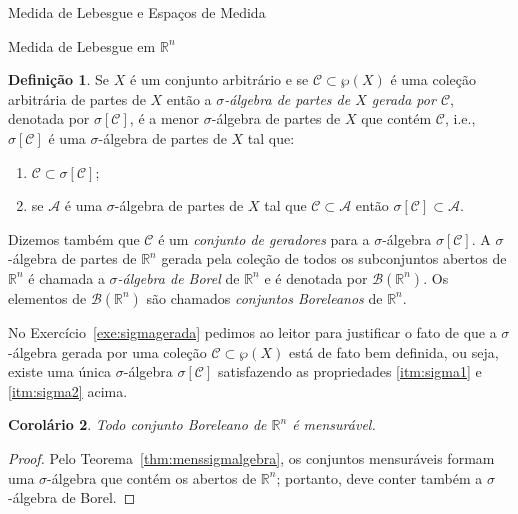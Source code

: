 \documentclass[oneside,final,11pt]{amsbook}
\newcommand{\R}{\mathds R}
\newcommand{\Borel}{\mathcal B}
\theoremstyle{remark}\newtheorem{exercise}{Exercício}[chapter]
\theoremstyle{remark}\newtheorem{*exercise}[exercise]{\hbox to 0pt{\hskip 0pt minus 1fil*}Exercício}
\theoremstyle{definition}\newtheorem{exdefin}{Definição}[chapter]
\theoremstyle{plain}\newtheorem{teo}{Teorema}[section]
\theoremstyle{plain}\newtheorem{lem}[teo]{Lema}
\theoremstyle{plain}\newtheorem{prop}[teo]{Proposição}
\theoremstyle{plain}\newtheorem{cor}[teo]{Corolário}
\theoremstyle{definition}\newtheorem{defin}[teo]{Definição}
\theoremstyle{remark}\newtheorem{rem}[teo]{Observação}
\theoremstyle{definition}\newtheorem{notation}[teo]{Notação}
\theoremstyle{definition}\newtheorem{convention}[teo]{Convenção}
\theoremstyle{definition}\newtheorem{example}[teo]{Exemplo}
\numberwithin{section}{chapter}
\numberwithin{equation}{section}
\begin{document}
\begin{chapter}{Medida de Lebesgue e Espaços de Medida}
\begin{section}[Medida de Lebesgue em $\R^n$]{Medida de Lebesgue em ${\R^n}$}
\begin{defin}\label{thm:defsigmagerada}
Se $X$ é um conjunto arbitrário e se $\mathcal C\subset\wp(X)$ é uma coleção arbitrária de partes de $X$ então
a {\em $\sigma$-álgebra de partes de $X$ gerada por $\mathcal C$\/}, denotada por $\sigma[\mathcal C]$\index[simbolos]{$\sigma[\mathcal C]$}, é a menor $\sigma$-álgebra
de partes de $X$ que contém $\mathcal C$, i.e., $\sigma[\mathcal C]$ é uma $\sigma$-álgebra de partes de $X$ tal que:
\begin{enumerate}
\item\label{itm:sigma1} $\mathcal C\subset\sigma[\mathcal C]$;
\item\label{itm:sigma2} se $\mathcal A$ é uma $\sigma$-álgebra de partes de $X$ tal que $\mathcal C\subset\mathcal A$ então
$\sigma[\mathcal C]\subset\mathcal A$.
\end{enumerate}
Dizemos também que $\mathcal C$ é um
{\em conjunto de geradores\/}
para a $\sigma$-álgebra $\sigma[\mathcal C]$.
A $\sigma$-álgebra de partes de $\R^n$ gerada pela coleção de todos os subconjuntos abertos de $\R^n$ é chamada a {\em
$\sigma$-álgebra de Borel\/} de
$\R^n$ e é denotada por $\Borel(\R^n)$. Os elementos de $\Borel(\R^n)$\index[simbolos]{$\Borel(\R^n)$}
são chamados {\em conjuntos Boreleanos\/} de $\R^n$.
\end{defin}
No Exercício~\ref{exe:sigmagerada} pedimos ao leitor para justificar o fato de que a $\sigma$-álgebra
gerada por uma coleção $\mathcal C\subset\wp(X)$ está de fato bem definida,
ou seja, existe uma única $\sigma$-álgebra $\sigma[\mathcal C]$ satisfazendo as propriedades \eqref{itm:sigma1} e \eqref{itm:sigma2}
acima.

\begin{cor}\label{thm:corBormens}
Todo conjunto Boreleano de $\R^n$ é mensurável.
\end{cor}
\begin{proof}
Pelo Teorema~\ref{thm:menssigmalgebra}, os conjuntos mensuráveis formam uma $\sigma$-álgebra que contém os abertos
de $\R^n$; portanto, deve conter também a $\sigma$-álgebra de Borel.
\end{proof}


\end{section}
\end{chapter}
\end{document}
